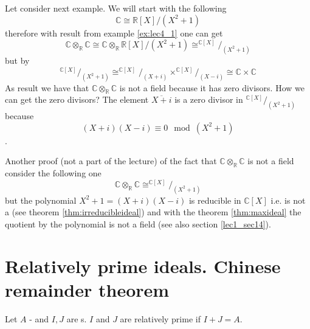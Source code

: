 Let consider next example.
We will start with the following
\[
\mathbb{C} \cong {\mathbb{R}\left[X\right]}/{\left(X^2 + 1\right)}
\]
therefore with result from example \ref{ex:lec4_1} one can get
\[
\mathbb{C} \otimes_\mathbb{R} \mathbb{C}
\cong
\mathbb{C} \otimes_\mathbb{R}
{\mathbb{R}\left[X\right]}/{\left(X^2 + 1\right)}
\cong
^{\mathbb{C}\left[X\right]}/_{\left(X^2 + 1\right)}
\]
but by 
\[
^{\mathbb{C}\left[X\right]}/_{\left(X^2 + 1\right)}
\cong
^{\mathbb{C}\left[X\right]}/_{\left(X + i\right)}
\times
^{\mathbb{C}\left[X\right]}/_{\left(X - i\right)}
\cong
\mathbb{C} \times \mathbb{C}
\]
As result we have that
$\mathbb{C} \otimes_\mathbb{R} \mathbb{C}$ is not a field
because it
has zero divisors. How we can get the zero divisors? 
The element $\overline{X + i}$ is a zero divisor
in
\(
^{\mathbb{C}\left[X\right]}/_{\left(X^2 + 1\right)}
\)
because
\[
\left(X + i\right) \left(X - i\right) \equiv 0 \mod {\left(X^2 + 1\right)}
\].

Another proof (not a part of the lecture) of the fact that $\mathbb{C}
\otimes_\mathbb{R} \mathbb{C}$ is not a field consider the following
one
\[
\mathbb{C}
\otimes_\mathbb{R} \mathbb{C}
\cong
^{\mathbb{C}\left[X\right]}/_{\left(X^2 + 1\right)}
\]
but the polynomial $X^2 + 1 = \left(X + i\right)\left(X - i \right)$
is reducible in $\mathbb{C}\left[X\right]$ i.e. is not a
 (see theorem \ref{thm:irreducibleideal}) and
with the theorem \ref{thm:maxideal} the quotient by the polynomial is
not a field (see also section \ref{lec1_sec14}).  


\section{Relatively prime ideals. Chinese remainder theorem}

\begin{definition}
  Let $A$ -  and $I,J$ are s.
  $I$ and $J$ are relatively prime if $I + J = A$.
  \label{def:relprimeideals}
\end{definition}

